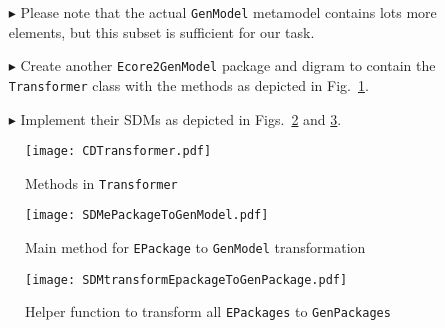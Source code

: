 \begin{enumerate}
\item[$\blacktriangleright$] Please note that the actual \texttt{GenModel} metamodel contains lots more elements, but this subset is sufficient for our task.

\item[$\blacktriangleright$] Create another \texttt{Ecore2GenModel} package and digram to contain the \texttt{Transformer} class with the methods as depicted in
Fig.~\ref{fig_e2gm}.

\item[$\blacktriangleright$] Implement their SDMs as depicted in Figs.~\ref{fig_pack2gm} and \ref{fig_transf}.
\end{enumerate}

\begin{figure}[htbp]
\begin{center}  
\texttt{[image: CDTransformer.pdf]}
\caption{Methods in \texttt{Transformer}}  
\label{fig_e2gm}
\end{center}
\end{figure} 

\begin{figure}[htbp]
\begin{center}  \texttt{[image: SDMePackageToGenModel.pdf]}
        \caption{Main method for \texttt{EPackage} to \texttt{GenModel} transformation}  
  \label{fig_pack2gm}
\end{center}
\end{figure} 

\begin{figure}[htbp]
\begin{center}  
\texttt{[image: SDMtransformEpackageToGenPackage.pdf]}
\caption{Helper function to transform all \texttt{EPackages} to \texttt{GenPackages}}  
\label{fig_transf}
\end{center}
\end{figure} 

